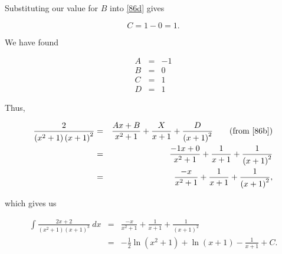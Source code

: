 Substituting our value for $B$ into \ref{86d} gives

\[C=1-0=1.\]

We have found

\begin{eqnarray*}
    A&=&-1\\
    B&=&0\\
    C&=&1\\
    D&=&1
\end{eqnarray*}

Thus,

\begin{eqnarray*}
    \frac{2}{\left(x^2+1\right)\left(x+1\right)^2}&=&\frac{Ax+B}{x^2+1}+\frac{X}{x+1}+\frac{D}{\left(x+1\right)^2}\qquad\mbox{(from \ref{86b})}\\
    &=&\frac{-1x+0}{x^2+1}+\frac{1}{x+1}+\frac{1}{\left(x+1\right)^2}\\
    &=&\frac{-x}{x^2+1}+\frac{1}{x+1}+\frac{1}{\left(x+1\right)^2},
\end{eqnarray*}

which gives us

\begin{eqnarray*}
    \int\frac{2x+2}{\left(x^2+1\right)\left(x+1\right)^3}~dx&=&\frac{-x}{x^2+1}+\frac{1}{x+1}+\frac{1}{\left(x+1\right)^2}\\
    &=&-\frac{1}{2}\ln\left(x^2+1\right)+\ln\left(x+1\right)-\frac{1}{x+1}+C.
\end{eqnarray*}
